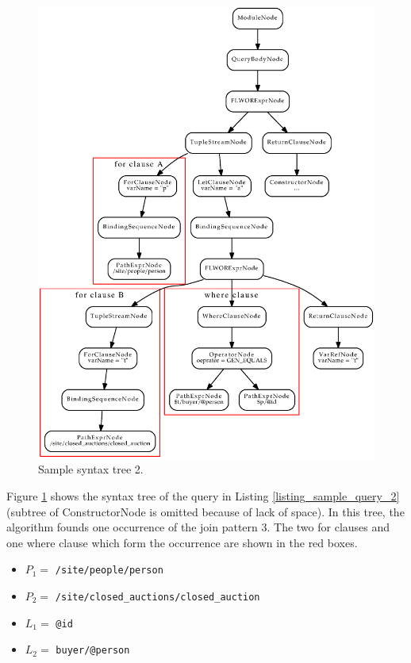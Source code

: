 \begin{figure}
\label{FIG_syntax_tree_2}
\caption{Sample syntax tree 2.}
\includegraphics[scale=0.7]{syntax_tree_2.eps}
\end{figure}

Figure \ref{FIG_syntax_tree_2} shows the syntax tree of the query in Listing \ref{listing_sample_query_2} (subtree of ConstructorNode is omitted because of lack of space). In this tree, the algorithm founds one occurrence of the join pattern 3. The two for clauses and one where clause which form the occurrence are shown in the red boxes.

\begin{itemize}
\item $P_1 =$ \texttt{/site/people/person}
\item $P_2 =$ \texttt{/site/closed\_auctions/closed\_auction}
\item $L_1 =$ \texttt{@id}
\item $L_2 =$ \texttt{buyer/@person}
\end{itemize}

